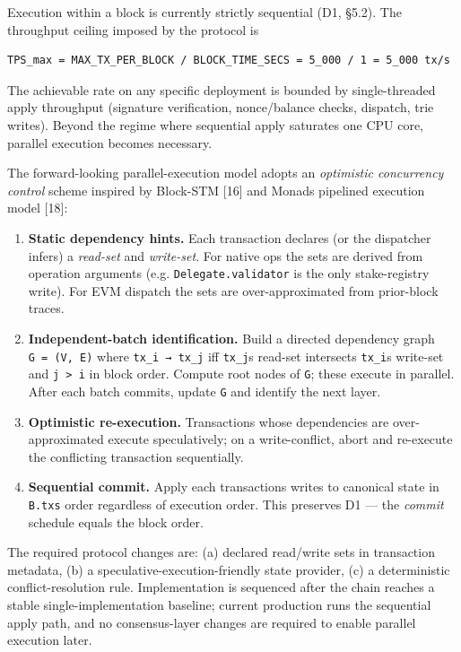 \documentclass[11pt,a4paper]{article}
\providecommand{\tightlist}{\setlength{\itemsep}{0pt}\setlength{\parskip}{0pt}}
\begin{document}
Execution within a block is currently strictly sequential (D1, §5.2).
The throughput ceiling imposed by the protocol is

\begin{verbatim}
TPS_max = MAX_TX_PER_BLOCK / BLOCK_TIME_SECS = 5_000 / 1 = 5_000 tx/s
\end{verbatim}

The achievable rate on any specific deployment is bounded by
single-threaded apply throughput (signature verification, nonce/balance
checks, dispatch, trie writes). Beyond the regime where sequential apply
saturates one CPU core, parallel execution becomes necessary.

The forward-looking parallel-execution model adopts an \emph{optimistic
concurrency control} scheme inspired by Block-STM {[}16{]} and
Monad\textquotesingle s pipelined execution model {[}18{]}:

\begin{enumerate}
\def\labelenumi{\arabic{enumi}.}
\tightlist
\item
  \textbf{Static dependency hints.} Each transaction declares (or the
  dispatcher infers) a \emph{read-set} and \emph{write-set}. For native
  ops the sets are derived from operation arguments (e.g.
  \texttt{Delegate.validator} is the only stake-registry write). For EVM
  dispatch the sets are over-approximated from prior-block traces.
\item
  \textbf{Independent-batch identification.} Build a directed dependency
  graph \texttt{G\ =\ (V,\ E)} where \texttt{tx\_i\ →\ tx\_j} iff
  \texttt{tx\_j}\textquotesingle s read-set intersects
  \texttt{tx\_i}\textquotesingle s write-set and
  \texttt{j\ \textgreater{}\ i} in block order. Compute root nodes of
  \texttt{G}; these execute in parallel. After each batch commits,
  update \texttt{G} and identify the next layer.
\item
  \textbf{Optimistic re-execution.} Transactions whose dependencies are
  over-approximated execute speculatively; on a write-conflict, abort
  and re-execute the conflicting transaction sequentially.
\item
  \textbf{Sequential commit.} Apply each transaction\textquotesingle s
  writes to canonical state in \texttt{B.txs} order regardless of
  execution order. This preserves D1 --- the \emph{commit} schedule
  equals the block order.
\end{enumerate}

The required protocol changes are: (a) declared read/write sets in
transaction metadata, (b) a speculative-execution-friendly state
provider, (c) a deterministic conflict-resolution rule. Implementation
is sequenced after the chain reaches a stable single-implementation
baseline; current production runs the sequential apply path, and no
consensus-layer changes are required to enable parallel execution later.
\end{document}
